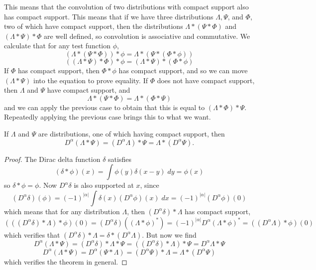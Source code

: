 This means that the convolution of two distributions with compact support also has compact support. This means that if we have three distributions $\Lambda, \Psi$, and $\Phi$, two of which have compact support, then the distributions $\Lambda * (\Psi * \Phi)$ and $(\Lambda * \Psi) * \Phi$ are well defined, so convolution is associative and commutative. We calculate that for any test function $\phi$,
%
\[ (\Lambda * (\Psi * \Phi)) * \phi = \Lambda * (\Psi * (\Phi * \phi)) \]
\[ ((\Lambda * \Psi) * \Phi) * \phi = (\Lambda * \Psi) * (\Phi * \phi) \]
%
If $\Phi$ has compact support, then $\Phi * \phi$ has compact support, and so we can move $(\Lambda * \Psi)$ into the equation to prove equality. If $\Phi$ does not have compact support, then $\Lambda$ and $\Psi$ have compact support, and
%
\[ \Lambda * (\Psi * \Phi) = \Lambda * (\Phi * \Psi) \]
%
and we can apply the previous case to obtain that this is equal to $(\Lambda * \Phi) * \Psi$. Repeatedly applying the previous case brings this to what we want.

\begin{theorem}
    If $\Lambda$ and $\Psi$ are distributions, one of which having compact support, then
    \[ D^\alpha(\Lambda * \Psi) = (D^\alpha \Lambda) * \Psi = \Lambda * (D^\alpha \Psi). \]
\end{theorem}
\begin{proof}
    The Dirac delta function $\delta$ satisfies
    \[ (\delta * \phi)(x) = \int \phi(y) \delta(x-y)\; dy = \phi(x) \]
    so $\delta * \phi = \phi$. Now $D^\alpha \delta$ is also supported at $x$, since
    \[ (D^\alpha \delta)(\phi) = (-1)^{|\alpha|} \int \delta(x) (D^\alpha \phi)(x)\; dx = (-1)^{|\alpha|} (D^\alpha \phi)(0) \]
    which means that for any distribution $\Lambda$, then $(D^\alpha \delta) * \Lambda$ has compact support,
    \[ (((D^\alpha \delta) * \Lambda) * \phi)(0) = (D^\alpha \delta)((\Lambda * \phi)^*) = (-1)^{|\alpha|} D^\alpha (\Lambda * \phi)^* = ((D^\alpha \Lambda) * \phi)(0) \]
    which verifies that $(D^\alpha \delta) * \Lambda = \delta * (D^\alpha \Lambda)$. But now we find
    \[ D^\alpha(\Lambda * \Psi) = (D^\alpha \delta) * \Lambda * \Psi = ((D^\alpha \delta) * \Lambda) * \Psi = D^\alpha \Lambda * \Psi \]
    \[ D^\alpha(\Lambda * \Psi) = D^\alpha(\Psi * \Lambda) = (D^\alpha \Psi) * \Lambda = \Lambda * (D^\alpha \Psi) \]
    which verifies the theorem in general.
\end{proof}




